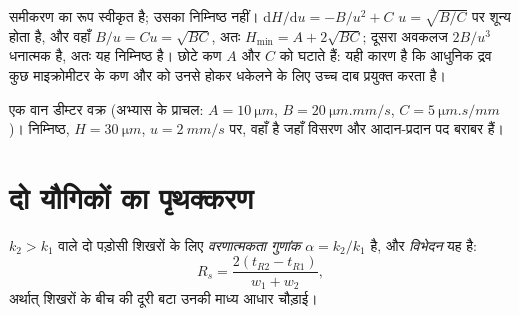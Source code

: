 \admitted

समीकरण का रूप स्वीकृत है; उसका निम्निष्ठ नहीं। $\mathrm dH/\mathrm du = -B/u^2 + C$
$u = \sqrt{B/C}$ पर शून्य होता है, और वहाँ $B/u = Cu = \sqrt{BC}$, अतः $H_{\min} = A + 2\sqrt{BC}$; दूसरा
अवकलज $2B/u^3$ धनात्मक है, अतः यह निम्निष्ठ है। छोटे कण $A$ और $C$ को घटाते हैं: यही कारण है कि
आधुनिक द्रव  कुछ माइक्रोमीटर के कण और  को उनसे होकर धकेलने के लिए
उच्च दाब प्रयुक्त करता है।

\begin{omfigure}

{\small एक वान डीम्टर वक्र (अभ्यास के प्राचल: $A = \qty{10}{\micro m}$, $B = \qty{20}{\micro m.mm/s}$,
$C = \qty{5}{\micro m.s/mm}$)। निम्निष्ठ, $H = \qty{30}{\micro m}$, $u = \qty{2}{mm/s}$ पर, वहाँ है जहाँ
विसरण और आदान-प्रदान पद बराबर हैं।}
\end{omfigure}

\section{दो यौगिकों का पृथक्करण}

\begin{definition}\label{def:b2:chromatography:separation}
$k_2 > k_1$ वाले दो पड़ोसी शिखरों के लिए \emph{वरणात्मकता गुणांक}
$\alpha = k_2/k_1$ है, और \emph{विभेदन} यह है:
\begin{equation*}
R_s = \frac{2(t_{R2} - t_{R1})}{w_1 + w_2},
\end{equation*}
अर्थात् शिखरों के बीच की दूरी बटा उनकी माध्य आधार चौड़ाई।
\end{definition}

